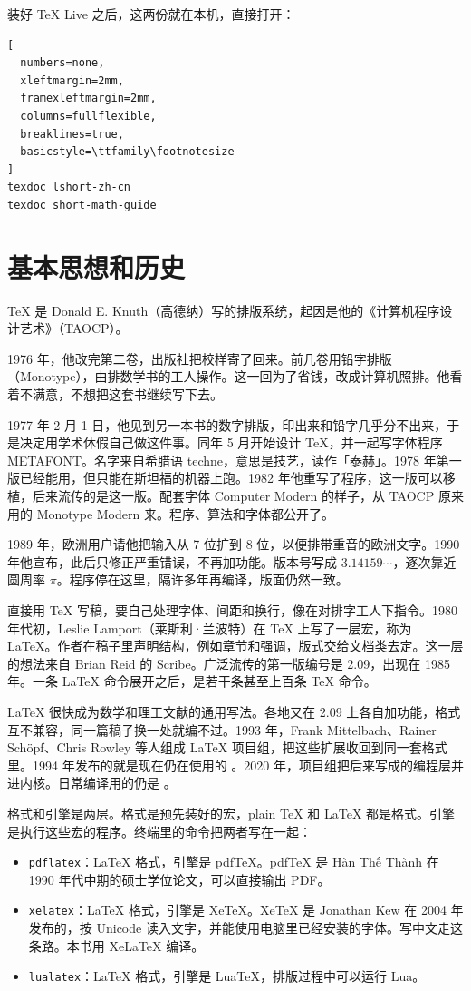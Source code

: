 装好 \TeX{} Live 之后，这两份就在本机，直接打开：
\begin{lstlisting}[
  numbers=none,
  xleftmargin=2mm,
  framexleftmargin=2mm,
  columns=fullflexible,
  breaklines=true,
  basicstyle=\ttfamily\footnotesize
]
texdoc lshort-zh-cn
texdoc short-math-guide
\end{lstlisting}


\section{基本思想和历史}
\TeX{} 是 Donald E. Knuth（高德纳）写的排版系统，起因是他的《计算机程序设计艺术》（TAOCP）。

1976 年，他改完第二卷，出版社把校样寄了回来。前几卷用铅字排版（Monotype），由排数学书的工人操作。这一回为了省钱，改成计算机照排。他看着不满意，不想把这套书继续写下去。

1977 年 2 月 1 日，他见到另一本书的数字排版，印出来和铅字几乎分不出来，于是决定用学术休假自己做这件事。同年 5 月开始设计 \TeX{}，并一起写字体程序 METAFONT。名字来自希腊语 techne，意思是技艺，读作「泰赫」。1978 年第一版已经能用，但只能在斯坦福的机器上跑。1982 年他重写了程序，这一版可以移植，后来流传的是这一版。配套字体 Computer Modern 的样子，从 TAOCP 原来用的 Monotype Modern 来。程序、算法和字体都公开了。

1989 年，欧洲用户请他把输入从 7 位扩到 8 位，以便排带重音的欧洲文字。1990 年他宣布，此后只修正严重错误，不再加功能。版本号写成 $3.14159\cdots$，逐次靠近圆周率 $\pi$。程序停在这里，隔许多年再编译，版面仍然一致。

直接用 \TeX{} 写稿，要自己处理字体、间距和换行，像在对排字工人下指令。1980 年代初，Leslie Lamport（莱斯利·兰波特）在 \TeX{} 上写了一层宏，称为 \LaTeX{}。作者在稿子里声明结构，例如章节和强调，版式交给文档类去定。这一层的想法来自 Brian Reid 的 Scribe。广泛流传的第一版编号是 2.09，出现在 1985 年。一条 \LaTeX{} 命令展开之后，是若干条甚至上百条 \TeX{} 命令。

\LaTeX{} 很快成为数学和理工文献的通用写法。各地又在 2.09 上各自加功能，格式互不兼容，同一篇稿子换一处就编不过。1993 年，Frank Mittelbach、Rainer Schöpf、Chris Rowley 等人组成 \LaTeX{} 项目组，把这些扩展收回到同一套格式里。1994 年发布的就是现在仍在使用的 \LaTeXe。2020 年，项目组把后来写成的编程层并进内核。日常编译用的仍是 \LaTeXe。

格式和引擎是两层。格式是预先装好的宏，plain \TeX{} 和 \LaTeX{} 都是格式。引擎是执行这些宏的程序。终端里的命令把两者写在一起：

\begin{itemize}
\item \verb|pdflatex|：\LaTeX{} 格式，引擎是 pdf\TeX{}。pdf\TeX{} 是 Hàn Thế Thành 在 1990 年代中期的硕士学位论文，可以直接输出 PDF。
\item \verb|xelatex|：\LaTeX{} 格式，引擎是 Xe\TeX{}。Xe\TeX{} 是 Jonathan Kew 在 2004 年发布的，按 Unicode 读入文字，并能使用电脑里已经安装的字体。写中文走这条路。本书用 Xe\LaTeX{} 编译。
\item \verb|lualatex|：\LaTeX{} 格式，引擎是 Lua\TeX{}，排版过程中可以运行 Lua。
\end{itemize}

